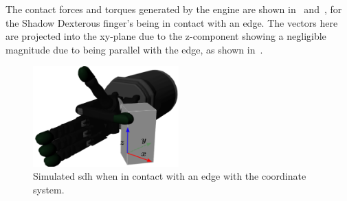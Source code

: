 The contact forces and torques generated by the engine are shown in~ and~, for the Shadow Dexterous finger's being in contact with an edge. The vectors here are projected into the xy-plane due to the z-component showing a negligible magnitude due to being parallel with the edge, as shown in~.

\begin{figure}[!h]
	\begin{center}
		\includegraphics[width=0.5\textwidth]{chapters/1-tactile-perception/fig/edge-contact-coor.pdf}
	\end{center}
	\caption{Simulated \gls{sdh} when in contact with an edge with the coordinate system.}
	\label{fig:edge-contact-coor}
\end{figure}

